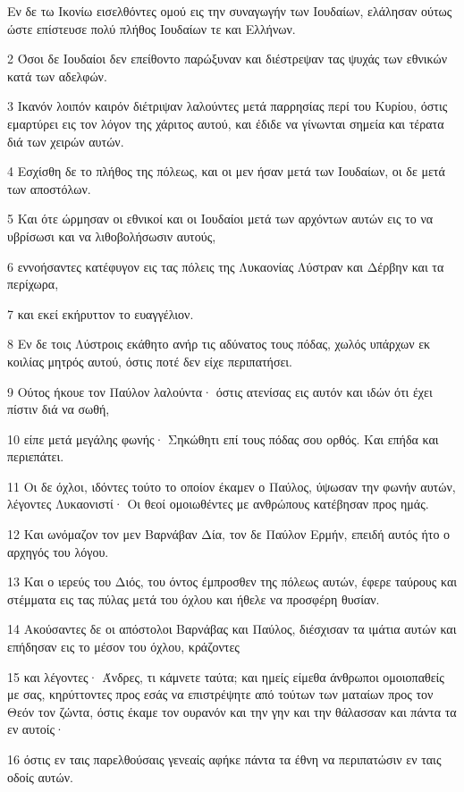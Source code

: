 \par Εν δε τω Ικονίω εισελθόντες ομού εις την συναγωγήν των Ιουδαίων, ελάλησαν ούτως ώστε επίστευσε πολύ πλήθος Ιουδαίων τε και Ελλήνων.
\par 2 Όσοι δε Ιουδαίοι δεν επείθοντο παρώξυναν και διέστρεψαν τας ψυχάς των εθνικών κατά των αδελφών.
\par 3 Ικανόν λοιπόν καιρόν διέτριψαν λαλούντες μετά παρρησίας περί του Κυρίου, όστις εμαρτύρει εις τον λόγον της χάριτος αυτού, και έδιδε να γίνωνται σημεία και τέρατα διά των χειρών αυτών.
\par 4 Εσχίσθη δε το πλήθος της πόλεως, και οι μεν ήσαν μετά των Ιουδαίων, οι δε μετά των αποστόλων.
\par 5 Και ότε ώρμησαν οι εθνικοί και οι Ιουδαίοι μετά των αρχόντων αυτών εις το να υβρίσωσι και να λιθοβολήσωσιν αυτούς,
\par 6 εννοήσαντες κατέφυγον εις τας πόλεις της Λυκαονίας Λύστραν και Δέρβην και τα περίχωρα,
\par 7 και εκεί εκήρυττον το ευαγγέλιον.
\par 8 Εν δε τοις Λύστροις εκάθητο ανήρ τις αδύνατος τους πόδας, χωλός υπάρχων εκ κοιλίας μητρός αυτού, όστις ποτέ δεν είχε περιπατήσει.
\par 9 Ούτος ήκουε τον Παύλον λαλούντα· όστις ατενίσας εις αυτόν και ιδών ότι έχει πίστιν διά να σωθή,
\par 10 είπε μετά μεγάλης φωνής· Σηκώθητι επί τους πόδας σου ορθός. Και επήδα και περιεπάτει.
\par 11 Οι δε όχλοι, ιδόντες τούτο το οποίον έκαμεν ο Παύλος, ύψωσαν την φωνήν αυτών, λέγοντες Λυκαονιστί· Οι θεοί ομοιωθέντες με ανθρώπους κατέβησαν προς ημάς.
\par 12 Και ωνόμαζον τον μεν Βαρνάβαν Δία, τον δε Παύλον Ερμήν, επειδή αυτός ήτο ο αρχηγός του λόγου.
\par 13 Και ο ιερεύς του Διός, του όντος έμπροσθεν της πόλεως αυτών, έφερε ταύρους και στέμματα εις τας πύλας μετά του όχλου και ήθελε να προσφέρη θυσίαν.
\par 14 Ακούσαντες δε οι απόστολοι Βαρνάβας και Παύλος, διέσχισαν τα ιμάτια αυτών και επήδησαν εις το μέσον του όχλου, κράζοντες
\par 15 και λέγοντες· Άνδρες, τι κάμνετε ταύτα; και ημείς είμεθα άνθρωποι ομοιοπαθείς με σας, κηρύττοντες προς εσάς να επιστρέψητε από τούτων των ματαίων προς τον Θεόν τον ζώντα, όστις έκαμε τον ουρανόν και την γην και την θάλασσαν και πάντα τα εν αυτοίς·
\par 16 όστις εν ταις παρελθούσαις γενεαίς αφήκε πάντα τα έθνη να περιπατώσιν εν ταις οδοίς αυτών.
